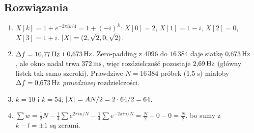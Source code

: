 \subsection*{Rozwiązania}
\begin{enumerate}
\item $X[k]=1+e^{-2\pi ik/4}=1+(-i)^k$: $X[0]=2$, $X[1]=1-i$, $X[2]=0$, $X[3]=1+i$. $\left\lvert X\right\rvert=(2,\sqrt2,0,\sqrt2)$.
\item $\Delta f=10{,}77\,\mathrm{Hz}$ i $0{,}673\,\mathrm{Hz}$. Zero-padding z $4096$ do $16\,384$ daje siatkę $0{,}673\,\mathrm{Hz}$, ale okno nadal trwa $372\,\mathrm{ms}$, więc rozdzielczość pozostaje $2{,}69\,\mathrm{Hz}$ (główny listek tak samo szeroki). Prawdziwe $N=16\,384$ próbek (1,5 s) miałoby $\Delta f=0{,}673\,\mathrm{Hz}$ \emph{prawdziwej} rozdzielczości.
\item $k=10$ i $k=54$; $\left\lvert X\right\rvert=AN/2=2\cdot64/2=64$.
\item $\sum w=\tfrac12N-\tfrac14\sum e^{2\pi in/N}-\tfrac14\sum e^{-2\pi in/N}=\tfrac N2-0-0=\tfrac N2$, bo sumy z $k-l=\pm1$ są zerami.
\end{enumerate}
